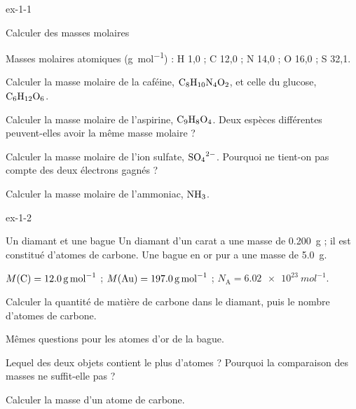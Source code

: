 \begin{blocLivre}{ex-1-1}
\begin{exercice}[1]{Calculer des masses molaires}
\begin{donnees}
Masses molaires atomiques (\unit{g.mol^{-1}}) : H 1,0 ; C 12,0 ; N 14,0 ; O 16,0 ; S 32,1.
\end{donnees}
\begin{questions}
\item Calculer la masse molaire de la caféine, $\ce{C8H10N4O2}$, et celle du glucose, $\ce{C6H12O6}$.
\item Calculer la masse molaire de l'aspirine, $\ce{C9H8O4}$. Deux espèces différentes peuvent-elles avoir la même masse
molaire ?
\item Calculer la masse molaire de l'ion sulfate, $\ce{SO4^{2-}}$. Pourquoi ne tient-on pas compte des deux électrons gagnés ?
\item Calculer la masse molaire de l'ammoniac, $\ce{NH3}$.
\end{questions}
\end{exercice}
\end{blocLivre}
\begin{blocLivre}{ex-1-2}
\begin{exercice}[1]{Un diamant et une bague}
Un diamant d'un carat a une masse de \qty{0,200}{g} ; il est constitué d'atomes de carbone. Une bague en or pur a une
masse de \qty{5,0}{g}.
\begin{donnees}
$M(\ce{C})=\qty{12,0}{g.mol^{-1}}$ ; $M(\ce{Au})=\qty{197,0}{g.mol^{-1}}$ ; $N_\mathrm{A}=\qty{6,02e23}{mol^{-1}}$.
\end{donnees}
\begin{questions}
\item Calculer la quantité de matière de carbone dans le diamant, puis le nombre d'atomes de carbone.
\item Mêmes questions pour les atomes d'or de la bague.
\item Lequel des deux objets contient le plus d'atomes ? Pourquoi la comparaison des masses ne suffit-elle pas ?
\item Calculer la masse d'un atome de carbone.
\end{questions}
\end{exercice}
\end{blocLivre}
